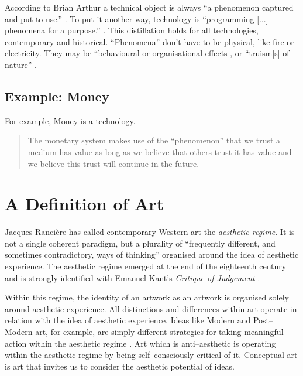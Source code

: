 \documentclass[letter:wpaper]{article}
\begin{document}
    According to Brian Arthur a technical object is always ``a phenomenon captured and put to use.'' \citep[p.53]{theNatureOfTechnology2009}. To put it another way, technology is ``programming [...] phenomena for a purpose.'' \citep[p.53]{theNatureOfTechnology2009}. This distillation holds for all technologies, contemporary and historical. ``Phenomena'' don't have to be physical, like fire or electricity. They may be ``behavioural or organisational  effects \citep[p.55]{theNatureOfTechnology2009}, or ``truism[s] of nature'' \citep[p.45]{theNatureOfTechnology2009}.

    \subsection{Example: Money}

    For example, Money is a technology.

    \begin{quote}
        The monetary system makes use of the ``phenomenon'' that we trust a medium has value as long as we believe that others trust it has value and we believe this trust will continue in the future. \citep[p.55]{theNatureOfTechnology2009}
    \end{quote}

\section{A Definition of Art}

    Jacques Rancière has called contemporary Western art the \emph{aesthetic regime}. It is not a single coherent paradigm, but a plurality of ``frequently different, and sometimes contradictory, ways of thinking'' \citep[p.8]{RanciereMdrnTms2022} organised around the idea of aesthetic experience. The aesthetic regime emerged at the end of the eighteenth century and is strongly identified with Emanuel Kant's \emph{Critique of Judgement} \citep[pp.23–24]{RancierPltcsOfThAsthtcs2004}. 

    Within this regime, the identity of an artwork as an artwork is organised solely around aesthetic experience. All distinctions and differences within art operate in relation with the idea of aesthetic experience. Ideas like Modern and Post–Modern art, for example, are simply different strategies for taking meaningful action within the aesthetic regime \citep[p213]{ZepkeSblmArt2017}. Art which is anti–aesthetic is operating within the aesthetic regime by being self–consciously critical of it. Conceptual art is art that invites us to consider the aesthetic potential of ideas.
\end{document}
